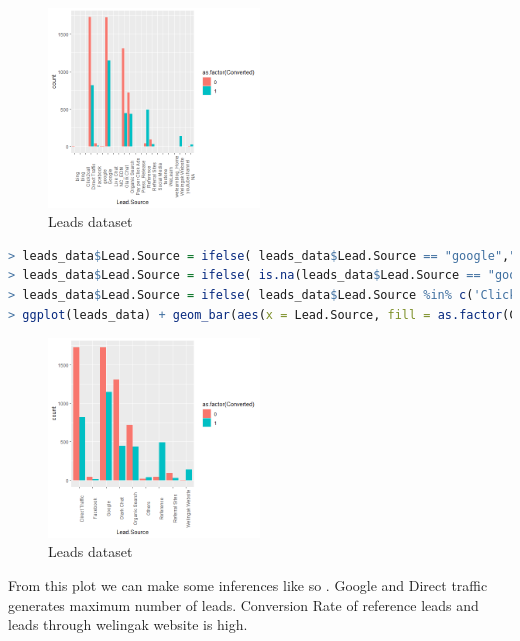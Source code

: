 \begin{figure}[H]
    \centering
    \includegraphics[width=0.5\textwidth]{assets/source.png}
    \caption{ Leads dataset}
\end{figure}
\begin{lstlisting}[language=R]
> leads_data$Lead.Source = ifelse( leads_data$Lead.Source == "google","Google",leads_data$Lead.Source)
> leads_data$Lead.Source = ifelse( is.na(leads_data$Lead.Source == "google"),"Others",leads_data$Lead.Source)
> leads_data$Lead.Source = ifelse( leads_data$Lead.Source %in% c('Click2call', 'Live Chat', 'NC_EDM', 'Pay per Click Ads', 'Press_Release','Social Media', 'WeLearn', 'bing', 'blog', 'testone', 'welearnblog_Home', 'youtubechannel'),"Others",leads_data$Lead.Source)
> ggplot(leads_data) + geom_bar(aes(x = Lead.Source, fill = as.factor(Converted)), position = "dodge") + theme(axis.text.x = element_text(angle = 90))
\end{lstlisting}
\begin{figure}[H]
    \centering
    \includegraphics[width=0.5\textwidth]{assets/s.png}
    \caption{ Leads dataset}
\end{figure}
From this plot we can make some inferences like so .
Google and Direct traffic generates maximum number of leads.
Conversion Rate of reference leads and leads through welingak website is high.
